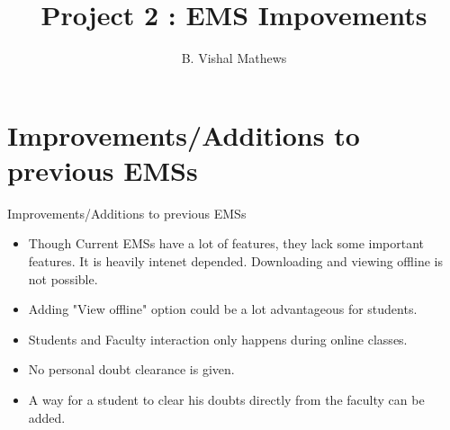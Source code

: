 \documentclass{beamer}
\begin{document}
\title{Project 2 : EMS Impovements}
		\author{ B. Vishal Mathews}
		
		
\begin{frame}
   \titlepage
    
\end{frame}
\begin{frame}
	\tableofcontents
\end{frame}
\newcommand{\bfr}[2]{\section{#1} \begin{frame}{#1} #2 \end{frame}}

\bfr{Improvements/Additions to previous EMSs}{

    \begin{itemize}
        \item Though Current EMSs have a lot of features, they lack some important features. It is heavily intenet depended. Downloading and viewing offline is not possible. 
        \item Adding "View offline" option could be a lot advantageous for students.
        
        \item Students and Faculty interaction only happens during online classes.
        \item No personal doubt clearance is given. 
        \item A way for a student to clear his doubts directly from the faculty can be added.
    \end{itemize}
    
}
\end{document}
